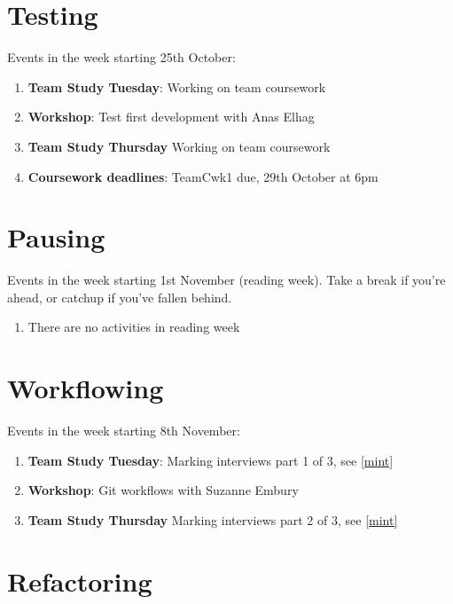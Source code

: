 \documentclass[
]{book}
\providecommand{\tightlist}{%
  \setlength{\itemsep}{0pt}\setlength{\parskip}{0pt}}
\begin{document}
\hypertarget{week5}{%
\section{Testing}\label{week5}}

Events in the week starting 25th October:

\begin{enumerate}
\def\labelenumi{\arabic{enumi}.}
\tightlist
\item
  \textbf{Team Study Tuesday}: Working on team coursework
\item
  \textbf{Workshop}: Test first development with Anas Elhag
\item
  \textbf{Team Study Thursday} Working on team coursework
\item
  \textbf{Coursework deadlines}: TeamCwk1 due, 29th October at 6pm
\end{enumerate}

\hypertarget{week6}{%
\section{Pausing}\label{week6}}

Events in the week starting 1st November (reading week). Take a break if you're ahead, or catchup if you've fallen behind.

\begin{enumerate}
\def\labelenumi{\arabic{enumi}.}
\tightlist
\item
  There are no activities in reading week
\end{enumerate}

\hypertarget{week7}{%
\section{Workflowing}\label{week7}}

Events in the week starting 8th November:

\begin{enumerate}
\def\labelenumi{\arabic{enumi}.}
\tightlist
\item
  \textbf{Team Study Tuesday}: Marking interviews part 1 of 3, see \ref{mint}
\item
  \textbf{Workshop}: Git workflows with Suzanne Embury
\item
  \textbf{Team Study Thursday} Marking interviews part 2 of 3, see \ref{mint}
\end{enumerate}

\hypertarget{week8}{%
\section{Refactoring}\label{week8}}
\end{document}
